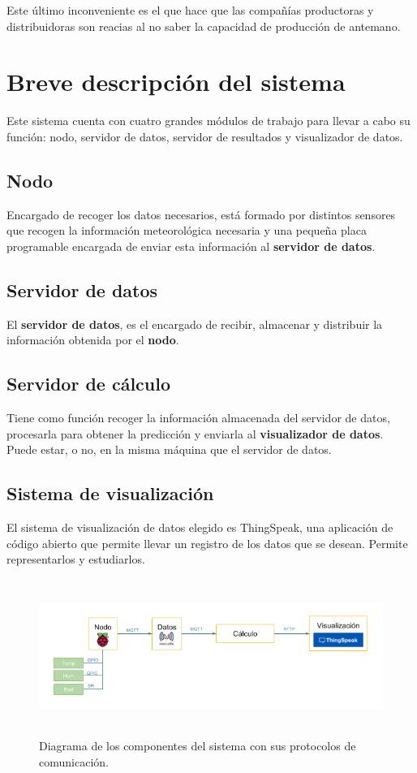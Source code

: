 Este último inconveniente es el que hace que las compañías productoras y distribuidoras son reacias al no saber la capacidad de producción de antemano.

\section{Breve descripción del sistema}
\label{makereference1.2}

Este sistema cuenta con cuatro grandes módulos de trabajo para llevar a cabo su función: nodo, servidor de datos, servidor de resultados y visualizador de datos.

\subsection{Nodo}
\label{makereference1.2.1}
Encargado de recoger los datos necesarios, está formado por distintos sensores que recogen la información meteorológica necesaria y una pequeña placa programable encargada de enviar esta información al \textbf{servidor de datos}.

\subsection{Servidor de datos}
\label{makereference1.2.2}
El \textbf{servidor de datos}, es el encargado de recibir, almacenar y distribuir la información obtenida por el \textbf{nodo}.

\subsection{Servidor de cálculo}
\label{makereference1.2.3}
Tiene como función recoger la información almacenada del servidor de datos, procesarla para obtener la predicción y enviarla al \textbf{visualizador de datos}. Puede estar, o no, en la misma máquina que el servidor de datos.

\subsection{Sistema de visualización}
\label{makereference1.2.4}
El sistema de visualización de datos elegido es ThingSpeak, una aplicación de código abierto que permite llevar un registro de los datos que se desean. Permite representarlos y estudiarlos.

\begin{figure}[htb]
    \begin{center}
        \includegraphics[height=2in]{figures/diagrama-sistema.png}
        \caption{Diagrama de los componentes del sistema con sus protocolos de comunicación.}
    \end{center}
    \label{diagrama-sistema}
\end{figure}
